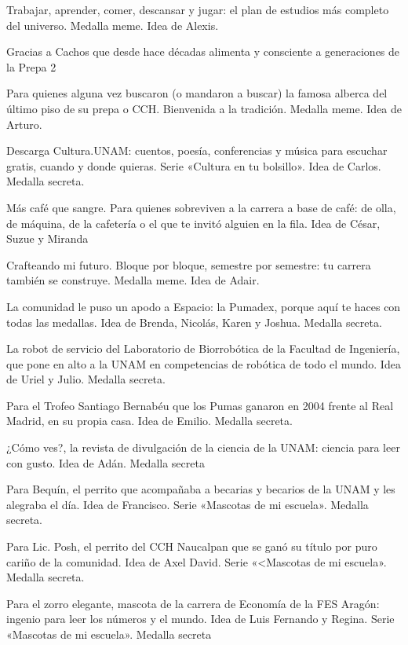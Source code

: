 \begin{description}[leftmargin=1.4cm, style=nextline]
  \item[R0SH1] Trabajar, aprender, comer, descansar y jugar: el plan de estudios más completo del universo. Medalla meme. Idea de Alexis.
  \item[C4CHOS] Gracias a Cachos que desde hace décadas alimenta y consciente a generaciones de la Prepa 2
  \item[A1B3RCA] Para quienes alguna vez buscaron (o mandaron a buscar) la famosa alberca del último piso de su prepa o CCH. Bienvenida a la tradición. Medalla meme. Idea de Arturo.
  \item[D3SC4RG4] Descarga Cultura.UNAM: cuentos, poesía, conferencias y música para escuchar gratis, cuando y donde quieras. Serie «Cultura en tu bolsillo». Idea de Carlos. Medalla secreta.
  \item[C4F3C1TO] Más café que sangre. Para quienes sobreviven a la carrera a base de café: de olla, de máquina, de la cafetería o el que te invitó alguien en la fila. Idea de César, Suzue y Miranda
  \item[CR4FT3O] Crafteando mi futuro. Bloque por bloque, semestre por semestre: tu carrera también se construye. Medalla meme. Idea de Adair.
  \item[P0K3D3X] La comunidad le puso un apodo a Espacio: la Pumadex, porque aquí te haces con todas las medallas. Idea de Brenda, Nicolás, Karen y Joshua. Medalla secreta.
  \item[JUST1NA] La robot de servicio del Laboratorio de Biorrobótica de la Facultad de Ingeniería, que pone en alto a la UNAM en competencias de robótica de todo el mundo. Idea de Uriel y Julio. Medalla secreta.
  \item[B3RN4B3U] Para el Trofeo Santiago Bernabéu que los Pumas ganaron en 2004 frente al Real Madrid, en su propia casa. Idea de Emilio. Medalla secreta.
  \item[C0M0V3S] ¿Cómo ves?, la revista de divulgación de la ciencia de la UNAM: ciencia para leer con gusto. Idea de Adán. Medalla secreta
  \item[B3QU1N] Para Bequín, el perrito que acompañaba a becarias y becarios de la UNAM y les alegraba el día. Idea de Francisco. Serie «Mascotas de mi escuela». Medalla secreta.
  \item[L1CPOSH] Para Lic. Posh, el perrito del CCH Naucalpan que se ganó su título por puro cariño de la comunidad. Idea de Axel David. Serie «<Mascotas de mi escuela». Medalla secreta.
  \item[4STUC14] Para el zorro elegante, mascota de la carrera de Economía de la FES Aragón: ingenio para leer los números y el mundo. Idea de Luis Fernando y Regina. Serie «Mascotas de mi escuela». Medalla secreta

\end{description}
